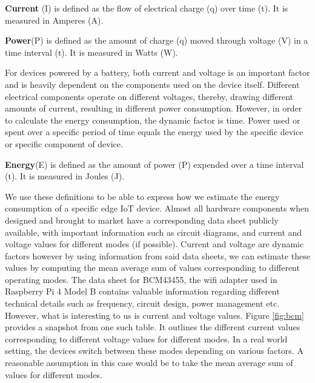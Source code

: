 \begin{definition}
    \textbf{Current }(I) is defined as the flow of electrical charge (q) over time (t). It is measured in Amperes (A).
\end{definition}

\begin{definition}
    \textbf{Power}(P) is defined as the amount of charge (q) moved through voltage (V) in a time interval (t). It is measured in Watts (W).
\end{definition}

For devices powered by a battery, both current and voltage is an important factor and is heavily dependent 
on the components used on the device itself. Different electrical components operate on different voltages, thereby, 
drawing different amounts of current, resulting in different power consumption. However, in order to calculate the 
energy consumption, the dynamic factor is time. Power used or spent over a specific period of time equals the 
energy used by the specific device or specific component of device. 

\begin{definition}
    \textbf{Energy}(E) is defined as the amount of power (P) expended over a time interval (t). It is measured in Joules (J).
\end{definition}

We use these definitions to be able to express how we estimate the energy consumption of a specific edge IoT device. 
Almost all hardware components when designed and brought to market have a corresponding data sheet publicly available, 
with important information such as circuit diagrams, and current and voltage values for different modes (if possible). Current 
and voltage are dynamic factors however by using information from said data sheets, we can estimate these values by 
computing the mean average sum of values corresponding to different operating modes. The data sheet for BCM43455, the 
wifi adapter used in Raspberry Pi 4 Model B \cite{cypress} contains valuable information regarding different technical 
details such as frequency, circuit design, power management etc. However, 
what is interesting to us is current and voltage values. Figure \ref{fig:bcm} provides a snapshot from one such table. 
It outlines the different current values corresponding to different voltage values for different modes. In a 
real world setting, the devices switch between these modes depending on various factors. A reasonable assumption 
in this case would be to take the mean average sum of values for different modes. \\

